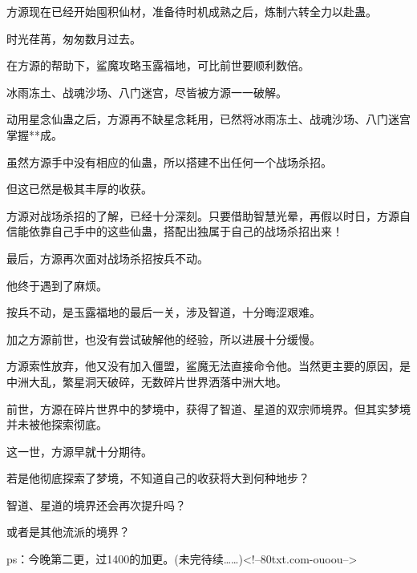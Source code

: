 \begin{this_body}
方源现在已经开始囤积仙材，准备待时机成熟之后，炼制六转全力以赴蛊。

时光荏苒，匆匆数月过去。

在方源的帮助下，鲨魔攻略玉露福地，可比前世要顺利数倍。

冰雨冻土、战魂沙场、八门迷宫，尽皆被方源一一破解。

动用星念仙蛊之后，方源再不缺星念耗用，已然将冰雨冻土、战魂沙场、八门迷宫掌握**成。

虽然方源手中没有相应的仙蛊，所以搭建不出任何一个战场杀招。

但这已然是极其丰厚的收获。

方源对战场杀招的了解，已经十分深刻。只要借助智慧光晕，再假以时日，方源自信能依靠自己手中的这些仙蛊，搭配出独属于自己的战场杀招出来！

最后，方源再次面对战场杀招按兵不动。

他终于遇到了麻烦。

按兵不动，是玉露福地的最后一关，涉及智道，十分晦涩艰难。

加之方源前世，也没有尝试破解他的经验，所以进展十分缓慢。

方源索性放弃，他又没有加入僵盟，鲨魔无法直接命令他。当然更主要的原因，是中洲大乱，繁星洞天破碎，无数碎片世界洒落中洲大地。

前世，方源在碎片世界中的梦境中，获得了智道、星道的双宗师境界。但其实梦境并未被他探索彻底。

这一世，方源早就十分期待。

若是他彻底探索了梦境，不知道自己的收获将大到何种地步？

智道、星道的境界还会再次提升吗？

或者是其他流派的境界？

ps：今晚第二更，过1400的加更。(未完待续……)<!--80txt.com-ouoou-->

\end{this_body}


